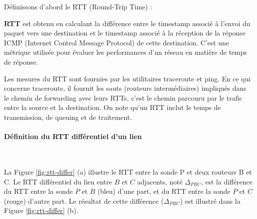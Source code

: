 Définissons d'abord le  RTT (Round-Trip Time) :
\begin{tcolorbox}
	\textbf{RTT} est obtenu en calculant la différence entre le timestamp associé à l'envoi du paquet vers une destination  et le timestamp associé à la réception de la réponse ICMP (Internet Control Message Protocol) de cette destination. C'est une métrique utilisée pour évaluer les performances d'un réseau en matière de temps de réponse. 
\end{tcolorbox}
Les mesures du RTT sont fournies par les utilitaires traceroute et ping. En ce qui concerne traceroute,  il fournit les sauts (routeurs intermédiaires) impliqués dans le  chemin de forwarding avec leurs RTTs, c'est le chemin parcouru par le trafic entre la source et la destination. On note qu'un  RTT inclut le temps de transmission, de queuing et  de traitement. 

\paragraph{Définition du RTT différentiel d'un lien }~

La Figure 	\ref{fig:rtt-differ} (a)  illustre le RTT entre la sonde P et deux routeurs B et C. Le RTT différentiel  du lien entre  $B$ et $C$ adjacents, noté $\Delta_{PBC}$, est la différence du RTT entre la sonde $P$ et $B$ (bleu) d'une part, et du RTT entre la sonde $P$ et $C$  (rouge) d'autre part.
Le résultat de cette différence ($\Delta_{PBC}$)  est   illustré dans la Figure	\ref{fig:rtt-differ} (b). 

